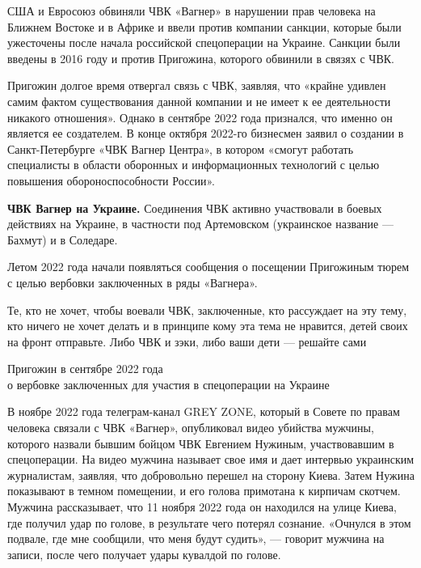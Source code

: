 США и Евросоюз обвиняли ЧВК «Вагнер» в нарушении прав человека на Ближнем Востоке и в Африке и ввели против компании санкции, которые были ужесточены после начала российской спецоперации на Украине. Санкции были введены в 2016 году и против Пригожина, которого обвинили в связях с ЧВК.

Пригожин долгое время отвергал связь с ЧВК, заявляя, что «крайне удивлен самим фактом существования данной компании и не имеет к ее деятельности никакого отношения». Однако в сентябре 2022 года признался, что именно он является ее создателем. В конце октября 2022-го бизнесмен заявил о создании в Санкт-Петербурге «ЧВК Вагнер Центра», в котором «смогут работать специалисты в области оборонных и информационных технологий с целью повышения обороноспособности России».

\textbf{ЧВК Вагнер на Украине.} Соединения ЧВК активно участвовали в боевых действиях на Украине, в частности под Артемовском (украинское название — Бахмут) и в Соледаре.

Летом 2022 года начали появляться сообщения о посещении Пригожиным тюрем с целью вербовки заключенных в ряды «Вагнера».

\begin{fancyquotes}
    Те, кто не хочет, чтобы воевали ЧВК, заключенные, кто рассуждает на эту тему, кто ничего не хочет делать и в принципе кому эта тема не нравится, детей своих на фронт отправьте. Либо ЧВК и зэки, либо ваши дети — решайте сами

    \begin{flushright}
        Пригожин в сентябре 2022 года\\
        о вербовке заключенных для участия в спецоперации на Украине
    \end{flushright}
\end{fancyquotes}

В ноябре 2022 года телеграм-канал GREY ZONE, который в Совете по правам человека связали с ЧВК «Вагнер», опубликовал видео убийства мужчины, которого назвали бывшим бойцом ЧВК Евгением Нужиным, участвовавшим в спецоперации. На видео мужчина называет свое имя и дает интервью украинским журналистам, заявляя, что добровольно перешел на сторону Киева. Затем Нужина показывают в темном помещении, и его голова примотана к кирпичам скотчем. Мужчина рассказывает, что 11 ноября 2022 года он находился на улице Киева, где получил удар по голове, в результате чего потерял сознание. «Очнулся в этом подвале, где мне сообщили, что меня будут судить», — говорит мужчина на записи, после чего получает удары кувалдой по голове.

